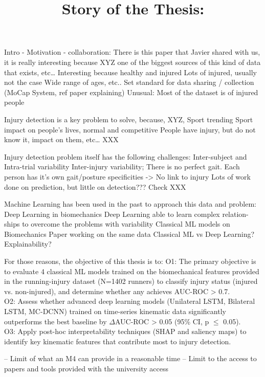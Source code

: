 \title{Story of the Thesis:}

Intro - Motivation - collaboration:
There is this paper that Javier shared with us, it is really interesting because XYZ
one of the biggest sources of this kind of data that exists, etc…
Interesting because healthy and injured
Lots of injured, usually not the case
Wide range of ages, etc..
Set standard for data sharing / collection (MoCap System, ref paper explaining)
Unusual: Most of the dataset is of injured people

Injury detection is a key problem to solve, because, XYZ,
Sport trending
Sport impact on people’s lives, normal and competitive
People have injury, but do not know it, impact on them, etc…
XXX

Injury detection problem itself has the following challenges:
Inter-subject and Intra-trial variability
Inter-injury variability; There is no perfect gait.
Each person has it’s own gait/posture specificities -> No link to injury
Lots of work done on prediction, but little on detection??? Check
XXX

Machine Learning has been used in the past to approach this data and problem:
Deep Learning in biomechanics
Deep Learning able to learn complex relation-ships to overcome the problems with variability
Classical ML models on Biomechanics
Paper working on the same data
Classical ML vs Deep Learning?
Explainability?


For those reasons, the objective of this thesis is to:
O1: The primary objective is to evaluate 4 classical ML models trained on the biomechanical features provided in the running-injury dataset (N=1402 runners) to classify injury status (injured vs. non-injured), and determine whether any achieves AUC-ROC > 0.7.\\

O2: Assess whether advanced deep learning models (Unilateral LSTM, Bilateral LSTM, MC-DCNN) trained on time-series kinematic data significantly outperforms the best baseline by $\Delta$AUC-ROC > 0.05 (95\% CI, p $\le$ 0.05).\\

O3: Apply post-hoc interpretability techniques (SHAP and saliency maps) to identify key kinematic features that contribute most to injury detection.


-- Limit of what an M4 can provide in a reasonable time
-- Limit to the access to papers and tools provided with the university access




